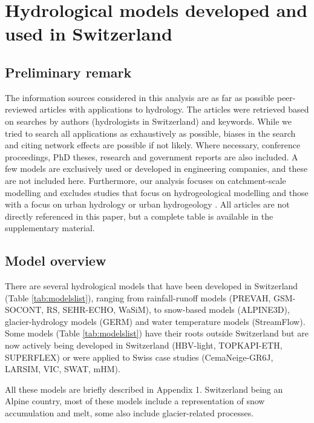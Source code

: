 \documentclass[10pt,a4paper]{article}
\begin{document}
\section{Hydrological models developed and used in Switzerland}
\label{sec:models}

\subsection{Preliminary remark}
\label{sec:models:remark}

The information sources considered in this analysis are as far as
possible peer-reviewed articles with applications to hydrology. The
articles were retrieved based on searches by authors (hydrologists in
Switzerland) and keywords. While we tried to search all applications as
exhaustively as possible, biases in the search and citing network
effects are possible if not likely. Where necessary, conference
proceedings, PhD theses, research and government reports are also
included. A few models are exclusively used or developed in engineering
companies, and these are not included here. Furthermore, our analysis
focuses on catchment-scale modelling and excludes studies that focus on
hydrogeological modelling \citep{Carlier2019} and those with a focus on
urban hydrology \citep{Peleg2017} or urban
hydrogeology \citep{schirmer2013}. All articles are not directly
referenced in this paper, but a complete table is available in the
supplementary material.

\subsection{Model overview}
\label{sec:models:overview}

There are several hydrological models that have been developed in
Switzerland (Table \ref{tab:modelslist}), ranging from
rainfall-runoff models (PREVAH, GSM-SOCONT, RS, SEHR-ECHO, WaSiM),
to snow-based models (ALPINE3D), glacier-hydrology models (GERM) and
water temperature models (StreamFlow). Some models
(Table \ref{tab:modelslist}) have their roots outside
Switzerland but are now actively being developed in Switzerland
(HBV-light, TOPKAPI-ETH, SUPERFLEX) or were applied to Swiss case
studies (CemaNeige-GR6J, LARSIM, VIC, SWAT, mHM). 

All these models are briefly described in Appendix 1. Switzerland being
an Alpine country, most of these models include a representation of snow
accumulation and melt, some also include glacier-related processes.
\end{document}
